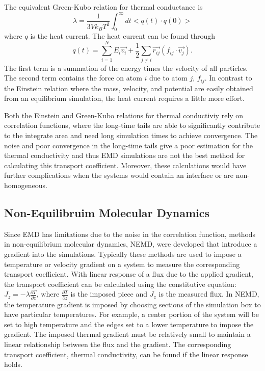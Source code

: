 The equivalent Green-Kubo relation for thermal conductance is
\begin{equation}
    \lambda = \frac{1}{3Vk_BT^2}\int^\infty_0 dt <q(t) \cdot q(0)>
\end{equation}
where $q$ is the heat current.
The heat current can be found through
\begin{equation}
    q(t) = \sum^N_{i=1} E_i \vec{v_i} + \frac{1}{2}\sum_{j \neq i} \vec{r_{ij}} (f_{ij} \cdot \vec{v_j}).
\end{equation}
The first term is a summation of the energy times the velocity of all particles. The second term contains the force on atom $i$ due to atom $j$, $f_{ij}$.
In contrast to the Einstein relation where the mass, velocity, and potential are easily obtained from an equilibrium simulation, the heat current requires a little more effort.

Both the Einstein and Green-Kubo relations for thermal conductiviy rely on correlation functions, where the long-time tails are able to significantly contribute to the integrate area and need long simulation times to achieve convergence.
The noise and poor convergence in the long-time tails give a poor estimation for the thermal conductivity and thus EMD simulations are not the best method for calculating this transport coefficient.
Moreover, these calculations would have further complications when the systems would contain an interface or are non-homogeneous.

\subsection{Non-Equilibruim Molecular Dynamics}
Since EMD has limitations due to the noise in the correlation function, methods in non-equilibrium molecular dynamics, NEMD, were developed that introduce a gradient into the simulations.\cite{Backer:2005sf,Hess:2002nr,Picalek:2009rz, Vasquez:2004ty}
Typically these methods are used to impose a temperature or velocity gradient on a system to measure the corresponding transport coefficient. \cite{Evans:1982oq, Erpenbeck:1984qe, Evans:1986nx, Vogelsang:1988qv, Maginn:1993kl, Hess:2002nr, Schelling:2002dp, Berthier:2002ai, Evans:2002tg, Vasquez:2004ty, Backer:2005sf, Jiang:2008hc, Picalek:2009rz}
With linear response of a flux due to the applied gradient, the transport coefficient can be calculated using the constitutive equation: $J_z = -\lambda \frac{\partial T}{\partial z}$, where $\frac{\partial T}{\partial z}$ is the imposed piece and $J_z$ is the measured flux.
In NEMD, the temperature gradient is imposed by choosing sections of the simulation box to have particular temperatures. For example, a center portion of the system will be set to high temperature and the edges set to a lower temperature to impose the gradient. 
The imposed thermal gradient must be relatively small to maintain a linear relationship between the flux and the gradient. 
The corresponding transport coefficient, thermal conductivity, can be found if the linear response holds.

